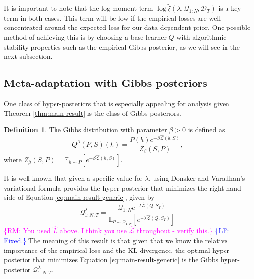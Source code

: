 \documentclass[letterpaper]{article} %
\theoremstyle{definition}
\newtheorem{defn}{Definition}[section]
\newcommand{\Expect}[2]{\mathbb{E}_{#1}\left [#2 \right ]}
\newcommand{\RM}[1]{\textcolor{magenta}{\{RM: #1\}}}
\newcommand{\LF}[1]{\textcolor{blue}{\{LF: #1\}}}
\begin{document}
It is important to note that the log-moment term $\log\tilde{\xi}(\lambda,\mathcal{Q}_{1:N},\mathcal{D}_T)$ is a key term in both cases. This term will be low if the empirical losses are well concentrated around the expected loss for our data-dependent prior. One possible method of achieving this is by choosing a base learner $Q$ with algorithmic stability properties such as the empirical Gibbs posterior, as we will see in the next subsection.


\subsection{Meta-adaptation with Gibbs posteriors} \label{sec:adapt-gibbs}

One class of hyper-posteriors that is especially appealing for analysis given Theorem \ref{thm:main-result} is the class of Gibbs posteriors.

\begin{defn} \label{defn:Gibbs}
	The Gibbs distribution with parameter $\beta>0$ is defined as $$
	Q^\beta(P,S)(h)=\frac{P(h)e^{-\beta \hat{\mathcal{L}}(h,S)}}{Z_\beta(S,P)}, 
	$$ 
	where $Z_\beta(S,P)=\Expect{h\sim P}{e^{-\beta\hat{\mathcal{L}}(h,S)}}.$
\end{defn}

It is well-known \citep{Catoni2004} that given a specific value for $\lambda$, using Donsker and Varadhan’s variational formula \citep{Donsker1975} provides the hyper-posterior that minimizes the right-hand side of Equation \ref{eq:main-result-generic}, given by
%
\begin{equation*}
    \mathcal{Q}^{\lambda}_{1:N,T}=\frac{\mathcal{Q}_{1:N}e^{-\lambda\hat{\mathcal{L}}(Q,S_T)}}{\Expect{P\sim \mathcal{Q}_{1:N}}{e^{-\lambda\hat{\mathcal{L}}(Q,S_T)}}}
\end{equation*}
\RM{You used $\hat L$ above. I think you use $\hat{\mathcal{L}}$ throughout - verify this.} \LF{Fixed.} The meaning of this result is that given that we know the relative importance of the empirical loss and the KL-divergence, the optimal hyper-posterior that minimizes Equation \ref{eq:main-result-generic} is the Gibbs hyper-posterior $\mathcal{Q}^{\lambda}_{1:N,T}$.
\end{document}
